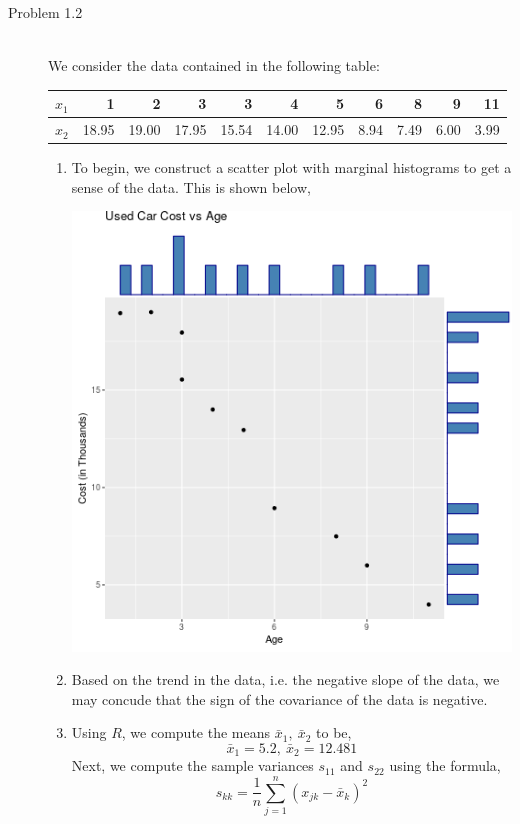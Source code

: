 \documentclass[letterpaper,10pt]{article}
\begin{document}
\begin{description}
\item[Problem 1.2] \hfill \\
We consider the data contained in the following table:
\begin{center}
\begin{tabular}{c|rrrrrrrrrr}
$x_1$ & 1 & 2 & 3 & 3 & 4 & 5 & 6 & 8 & 9 & 11\\\hline
$x_2$ & 18.95 & 19.00 & 17.95 & 15.54 & 14.00 & 12.95 & 8.94 & 7.49 & 6.00 & 3.99
\end{tabular}
\end{center}
\begin{enumerate}[label=(\alph*)]
\item To begin, we construct a scatter plot with marginal histograms to get a sense of the data. This is shown below,
\begin{center}
\includegraphics[scale=0.75]{12scatter.png}
\end{center}
\item Based on the trend in the data, i.e. the negative slope of the data, we may concude that the sign of the covariance of the data is negative.
\item Using $R$, we compute the means $\bar{x}_1,\ \bar{x}_2$ to be,
\[\bar{x}_1=5.2,\ \bar{x}_2=12.481\]
Next, we compute the sample variances $s_{11}$ and $s_{22}$ using the formula,
\[s_{kk}=\frac{1}{n}\sum_{j=1}^n(x_{jk}-\bar{x}_k)^2\]

\end{enumerate}
\end{description}
\end{document}
